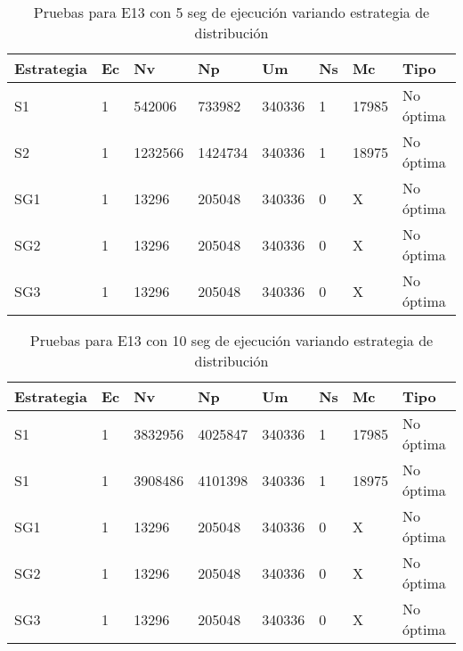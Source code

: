 \begin{center}
\begin{longtable}{|p{3cm}|p{1.0cm}|p{1.6cm}|p{1.6cm}|p{1.1cm}|p{1.1cm}|p{1.1cm}|p{2.7cm}|}
	\caption{Pruebas para E13 con 5 seg de ejecución variando estrategia de distribución} \\
	\hline
	\cellcolor[gray]{0.9} \textbf{Estrategia} & \cellcolor[gray]{0.9}\textbf{Ec} & \cellcolor[gray]{0.9}\textbf{Nv} & \cellcolor[gray]{0.9}\textbf{Np} & \cellcolor[gray]{0.9}\textbf{Um} & \cellcolor[gray]{0.9}\textbf{Ns} &  \cellcolor[gray]{0.9}\textbf{Mc} & \cellcolor[gray]{0.9}\textbf{Tipo}\\	\hline
	S1& 1 &542006  &733982 &340336  &1 &17985&No óptima \\
	\hline
	S2& 1 &1232566  &1424734 &340336  &1 &18975&No óptima \\
	\hline
	SG1& 1 &13296  &205048 &340336  &0 &X&No óptima \\
	\hline
	SG2& 1 &13296  &205048 &340336  &0 &X&No óptima \\
	\hline
	SG3& 1 &13296  &205048 &340336  &0 &X&No óptima \\
	\hline
\end{longtable}	
\end{center}

\begin{center}
\begin{longtable}{|p{3cm}|p{1.0cm}|p{1.6cm}|p{1.6cm}|p{1.1cm}|p{1.1cm}|p{1.1cm}|p{2.7cm}|}
	\caption{Pruebas para E13 con 10 seg de ejecución variando estrategia de distribución}\\
	\hline
	\cellcolor[gray]{0.9} \textbf{Estrategia} & \cellcolor[gray]{0.9}\textbf{Ec} & \cellcolor[gray]{0.9}\textbf{Nv} & \cellcolor[gray]{0.9}\textbf{Np} & \cellcolor[gray]{0.9}\textbf{Um} & \cellcolor[gray]{0.9}\textbf{Ns} &  \cellcolor[gray]{0.9}\textbf{Mc} & \cellcolor[gray]{0.9}\textbf{Tipo}\\	\hline
	S1& 1 &3832956  &4025847 &340336  &1 &17985&No óptima \\
	\hline
	S1& 1 &3908486  &4101398 &340336  &1 &18975&No óptima \\
	\hline
	SG1& 1 &13296  &205048 &340336  &0 &X&No óptima \\
	\hline
	SG2& 1 &13296  &205048 &340336  &0 &X&No óptima \\
	\hline
	SG3& 1 &13296  &205048 &340336  &0 &X&No óptima \\
	\hline
\end{longtable}	
\end{center}

